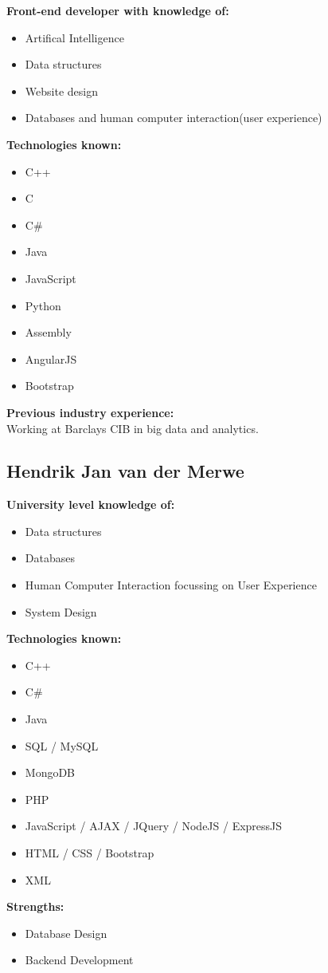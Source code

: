 \documentclass{article}
\begin{document}
\textbf{Front-end developer with knowledge of:}
\begin{itemize}
 	\item Artifical Intelligence
 	\item Data structures 
 	\item Website design 
 	\item Databases and human computer interaction(user experience)
 \end{itemize}
\textbf{Technologies known:}
\begin{itemize}
	\item C++ 
	\item C 
	\item C\# 
	\item Java 
	\item JavaScript 
	\item Python 
	\item Assembly 
	\item AngularJS  
	\item Bootstrap
 \end{itemize}
\textbf{Previous industry experience:}\\
Working at Barclays CIB in big data and analytics.
\\
\newpage
\subsection {Hendrik Jan van der Merwe} 
\textbf{University level knowledge of:}
\begin{itemize}
 	\item Data structures
 	\item Databases
 	\item Human Computer Interaction focussing on User Experience
 	\item System Design
\end{itemize}
\textbf{Technologies known:}
\begin{itemize}
	\item C++
	\item C\#
	\item Java
	\item SQL / MySQL
	\item MongoDB
	\item PHP
	\item JavaScript / AJAX / JQuery / NodeJS / ExpressJS
	\item HTML / CSS / Bootstrap
	\item XML
\end{itemize}
\textbf{Strengths:}
\begin{itemize}
	\item Database Design
	\item Backend Development
\end{itemize}
\end{document}

